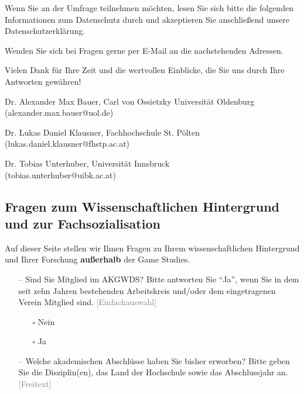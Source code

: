 \documentclass{scrartcl}
\begin{document}
Wenn Sie an der Umfrage teilnehmen möchten, lesen Sie sich bitte die folgenden Informationen zum Datenschutz durch und akzeptieren Sie anschließend unsere Datenschutzerklärung.

Wenden Sie sich bei Fragen gerne per E-Mail an die nachstehenden Adressen.

Vielen Dank für Ihre Zeit und die wertvollen Einblicke, die Sie uns durch Ihre Antworten gewähren!

\vspace{1em}
\noindent Dr. Alexander Max Bauer, Carl von Ossietzky Universität Oldenburg\\
(alexander.max.bauer@uol.de)

\vspace{1em}
\noindent Dr. Lukas Daniel Klausner, Fachhochschule St. Pölten\\
(lukas.daniel.klausner@fhstp.ac.at)

\vspace{1em}
\noindent Dr. Tobias Unterhuber, Universität Innsbruck\\
(tobias.unterhuber@uibk.ac.at)


\subsection*{Fragen zum Wissenschaftlichen Hintergrund und zur Fachsozialisation}
Auf dieser Seite stellen wir Ihnen Fragen zu Ihrem wissenschaftlichen Hintergrund und Ihrer Forschung \textbf{außerhalb} der Game Studies.

\begin{itemize}
   \item[--] Sind Sie Mitglied im AKGWDS? Bitte antworten Sie \enquote{Ja}, wenn Sie in dem seit zehn Jahren bestehenden Arbeitskreis und/oder dem eingetragenen Verein Mitglied sind. \textcolor{gray}{\textsf{[Einfachauswahl]}}
   \begin{itemize}
      \item[$\square$] Nein
      \item[$\square$] Ja
   \end{itemize}
   \item[--] Welche akademischen Abschlüsse haben Sie bisher erworben? Bitte geben Sie die Disziplin(en), das Land der Hochschule sowie das Abschlussjahr an. \textcolor{gray}{\textsf{[Freitext]}}
\end{itemize}
\end{document}
